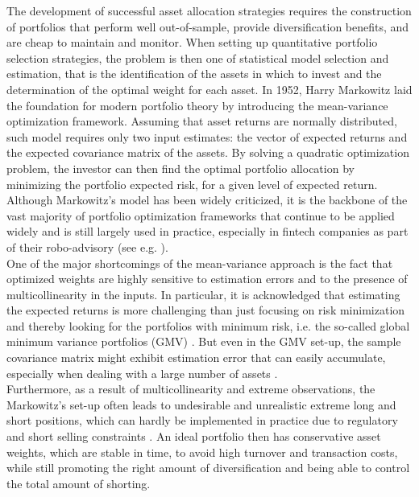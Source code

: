 \documentclass[12pt, a4paper]{article}
\begin{document}
The development of successful asset allocation strategies requires the construction of portfolios that perform well out-of-sample, provide diversification benefits, and are cheap to maintain and monitor. When setting up quantitative portfolio selection strategies, the problem is then one of statistical model selection and estimation, that is the identification of the assets in which to invest and the determination of the optimal weight for each asset. In 1952, Harry Markowitz laid the foundation for modern portfolio theory by introducing the mean-variance optimization framework. Assuming that asset returns are normally distributed, such model requires only two input estimates: the vector of expected returns and the expected covariance matrix of the assets. By solving a quadratic optimization problem, the investor can then find the optimal portfolio allocation by minimizing the portfolio expected risk, for a given level of expected return. Although Markowitz's model has been widely criticized, it is the backbone of the vast majority of portfolio optimization frameworks that continue to be applied widely and is still largely used in practice, especially in fintech companies as part of their robo-advisory (see e.g. \cite{Kolm2014}).\\
One of the major shortcomings of the mean-variance approach is the fact that optimized weights are highly sensitive to estimation errors and to the presence of multicollinearity in the inputs. In particular, it is acknowledged that estimating the expected returns is more challenging than just focusing on risk minimization and thereby looking for the portfolios with minimum risk, i.e. the so-called global minimum variance portfolios (GMV) \citep{Merton1980, Chopra1993, Jagannathan2003}. But even in the GMV set-up, the sample covariance matrix might exhibit estimation error that can easily accumulate, especially when dealing with a large number of assets \citep{Michaud1989, Ledoit2003, DeMiguel2009b, Fan2012}.\\
Furthermore, as a result of multicollinearity and extreme observations, the Markowitz's set-up often leads to undesirable and unrealistic extreme long and short positions, which can hardly be implemented in practice due to regulatory and short selling constraints \citep{Shefrin2000, DeMiguel2009, Boyle2012, Roncalli2013}. An ideal portfolio then has conservative asset weights, which are stable in time, to avoid high turnover and transaction costs, while still promoting the right amount of diversification and being able to control the total amount of shorting.\\
\end{document}
